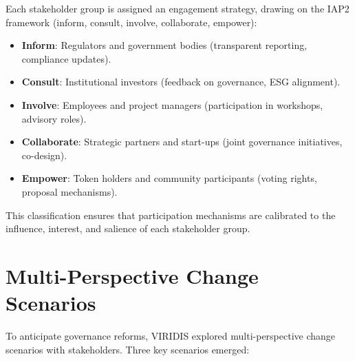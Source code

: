 \documentclass[
  english,
  12pt,
  oneside,
  open=any]{scrbook}
\providecommand{\tightlist}{%
  \setlength{\itemsep}{0pt}\setlength{\parskip}{0pt}}\usepackage{longtable,booktabs,array}
\begin{document}
Each stakeholder group is assigned an engagement strategy, drawing on
the IAP2 framework (inform, consult, involve, collaborate, empower):

\begin{itemize}
\tightlist
\item
  \textbf{Inform}: Regulators and government bodies (transparent
  reporting, compliance updates).\\
\item
  \textbf{Consult}: Institutional investors (feedback on governance, ESG
  alignment).\\
\item
  \textbf{Involve}: Employees and project managers (participation in
  workshops, advisory roles).\\
\item
  \textbf{Collaborate}: Strategic partners and start-ups (joint
  governance initiatives, co-design).\\
\item
  \textbf{Empower}: Token holders and community participants (voting
  rights, proposal mechanisms).
\end{itemize}

This classification ensures that participation mechanisms are calibrated
to the influence, interest, and salience of each stakeholder group.

\section{Multi-Perspective Change Scenarios}\label{sec-scenarios}

To anticipate governance reforms, VIRIDIS explored multi-perspective
change scenarios with stakeholders. Three key scenarios emerged:
\end{document}

